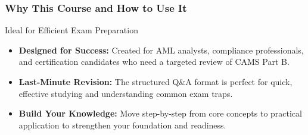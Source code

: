 \documentclass[12pt,aspectratio=169]{beamer}
\renewcommand{\scriptsize}{\fontsize{5}{6}\selectfont}
\newcommand{\keypoint}[1]{\textcolor{deepblue}{\textbf{#1}}}
\begin{document}
	\begin{frame}
		\frametitle{\fontsize{11}{13}\selectfont Why This Course and How to Use It}
		\scriptsize
		\begin{block}{\fontsize{9}{11}\selectfont Ideal for Efficient Exam Preparation}
			\vspace{0.05cm}
			\scriptsize
			\begin{itemize}
				\item \keypoint{Designed for Success:} Created for AML analysts, compliance professionals, and certification candidates who need a targeted review of CAMS Part B.
				\item \keypoint{Last-Minute Revision:} The structured Q\&A format is perfect for quick, effective studying and understanding common exam traps.
				\item \keypoint{Build Your Knowledge:} Move step-by-step from core concepts to practical application to strengthen your foundation and readiness.
			\end{itemize}
			\vspace{0.05cm}
		\end{block}
		\vspace{0.05cm}
		\begin{center}
		\end{center}
	\end{frame}
	
\end{document}
